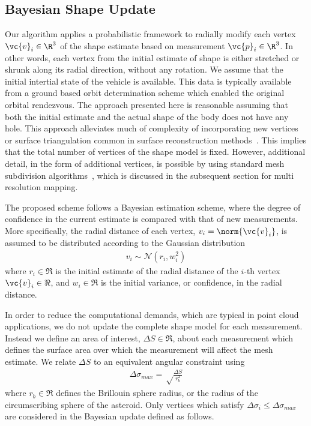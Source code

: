 \documentclass[smallextended]{svjour3}       %
\begin{document}
\subsection{Bayesian Shape Update}

Our algorithm applies a probabilistic framework to radially modify each vertex \( \vc{v}_i \in \R^3\) of the shape estimate based on measurement \( \vc{p}_i \in \R^3 \). 
In other words, each vertex from the initial estimate of shape is either stretched or shrunk along its radial direction, without any rotation. 
We assume that the initial intertial state of the vehicle is available. 
This data is typically available from a ground based orbit determination scheme which enabled the original orbital rendezvous. 
The approach presented here is reasonable assuming that both the initial estimate and the actual shape of the body does not have any hole. 
This approach alleviates much of complexity of incorporating new vertices or surface triangulation common in surface reconstruction methods~\cite{berg2008}.
This implies that the total number of vertices of the shape model is fixed.
However, additional detail, in the form of additional vertices, is possible by using standard mesh subdivision algorithms~\cite{orourke1998}, which is discussed in the subsequent section for multi resolution mapping.

The proposed scheme follows a Bayesian estimation scheme, where the degree of confidence in the current estimate is compared with that of new measurements. 
More specifically, the radial distance of each vertex, \( v_i = \norm{\vc{v}_i}\), is assumed to be distributed according to the Gaussian distribution
\begin{align*}
    v_i \sim \mathcal{N}(r_i, w_i^2)
\end{align*}
where \( r_i\in\Re \) is the initial estimate of the radial distance of the $i$-th vertex \( \vc{v}_i\in\Re\), and \( w_i\in\Re \) is the initial variance, or confidence, in the radial distance.

In order to reduce the computational demands, which are typical in point cloud applications, we do not update the complete shape model for each measurement.
Instead we define an area of interest, \( \Delta S\in\Re \), about each measurement which defines the surface area over which the measurement will affect the mesh estimate.
We relate \( \Delta S \) to an equivalent angular constraint using
\begin{align}\label{eq:region_of_interest}
    \Delta \sigma_{max} = \sqrt \frac{\Delta S}{r_b^2}
\end{align}
where \( r_b \in \Re \) defines the Brillouin  sphere radius, or the radius of the circumscribing sphere of the asteroid.
Only vertices which satisfy \( \Delta \sigma_i \leq \Delta \sigma_{max} \) are considered in the Bayesian update defined as follows.
\end{document}

